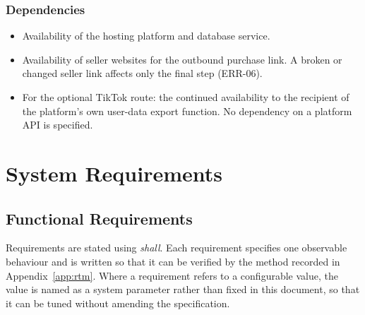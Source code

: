 \documentclass[11pt,a4paper]{report}
\begin{document}
\subsection*{Dependencies}
\begin{itemize}
  \item Availability of the hosting platform and database service.
  \item Availability of seller websites for the outbound purchase link. A broken or changed
        seller link affects only the final step (ERR-06).
  \item For the optional TikTok route: the continued availability to the recipient of the
        platform's own user-data export function. No dependency on a platform API is
        specified.
\end{itemize}

\chapter{System Requirements}

\section{Functional Requirements}
\label{sec:fr}
Requirements are stated using \emph{shall}. Each requirement specifies one observable
behaviour and is written so that it can be verified by the method recorded in
Appendix~\ref{app:rtm}. Where a requirement refers to a configurable value, the value is
named as a system parameter rather than fixed in this document, so that it can be tuned
without amending the specification.
\end{document}
